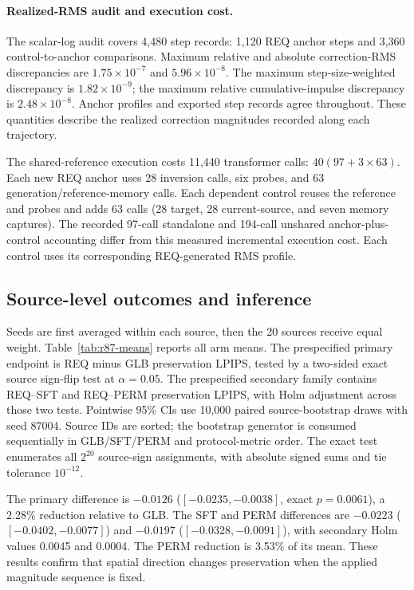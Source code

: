 \paragraph{Realized-RMS audit and execution cost.}
The scalar-log audit covers 4,480 step records: 1,120 REQ anchor steps and 3,360 control-to-anchor comparisons. Maximum relative and absolute correction-RMS discrepancies are $1.75\times10^{-7}$ and $5.96\times10^{-8}$. The maximum step-size-weighted discrepancy is $1.82\times10^{-9}$; the maximum relative cumulative-impulse discrepancy is $2.48\times10^{-8}$. Anchor profiles and exported step records agree throughout. These quantities describe the realized correction magnitudes recorded along each trajectory.

The shared-reference execution costs 11,440 transformer calls: $40(97+3\times63)$. Each new REQ anchor uses 28 inversion calls, six probes, and 63 generation/reference-memory calls. Each dependent control reuses the reference and probes and adds 63 calls (28 target, 28 current-source, and seven memory captures). The recorded 97-call standalone and 194-call unshared anchor-plus-control accounting differ from this measured incremental execution cost. Each control uses its corresponding REQ-generated RMS profile.


\subsection{Source-level outcomes and inference}
Seeds are first averaged within each source, then the 20 sources receive equal weight. Table~\ref{tab:r87-means} reports all arm means. The prespecified primary endpoint is REQ minus GLB preservation LPIPS, tested by a two-sided exact source sign-flip test at $\alpha=0.05$. The prespecified secondary family contains REQ--SFT and REQ--PERM preservation LPIPS, with Holm adjustment across those two tests. Pointwise 95\% CIs use 10,000 paired source-bootstrap draws with seed 87004. Source IDs are sorted; the bootstrap generator is consumed sequentially in GLB/SFT/PERM and protocol-metric order. The exact test enumerates all $2^{20}$ source-sign assignments, with absolute signed sums and tie tolerance $10^{-12}$.

The primary difference is $-0.0126$ ($[-0.0235,-0.0038]$, exact $p=0.0061$), a 2.28\% reduction relative to GLB. The SFT and PERM differences are $-0.0223$ ($[-0.0402,-0.0077]$) and $-0.0197$ ($[-0.0328,-0.0091]$), with secondary Holm values 0.0045 and 0.0004. The PERM reduction is 3.53\% of its mean. These results confirm that spatial direction changes preservation when the applied magnitude sequence is fixed.

